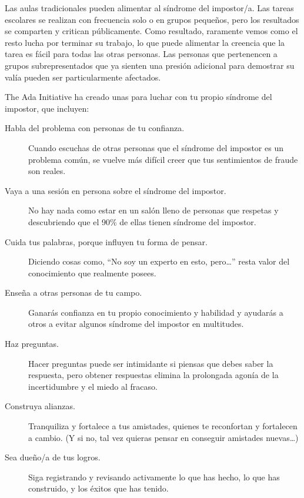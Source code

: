 Las aulas tradicionales pueden alimentar al síndrome del impostor/a.
Las tareas escolares se realizan con frecuencia solo o en grupos pequeños,
pero los resultados se comparten y critican públicamente.
Como resultado,
raramente vemos como el resto lucha por terminar su trabajo,
lo que puede alimentar la creencia que la tarea es fácil para todas las otras personas.
Las personas que pertenencen a grupos subrepresentados que ya sienten una presión adicional para demostrar su valía
pueden ser particularmente afectados.

The Ada Initiative ha creado unas 
para luchar con tu propio síndrome del impostor,
que incluyen:

\begin{description}

\item[Habla del problema con personas de tu confianza.]
  Cuando escuchas de otras personas que el síndrome del impostor es un problema común,
  se vuelve más difícil creer que tus sentimientos de fraude son reales.

\item[Vaya a una sesión en persona sobre el síndrome del impostor.]
  No hay nada como estar en un salón lleno de personas que respetas
  y descubriendo que el 90\% de ellas tienen síndrome del impostor.

\item[Cuida tus palabras, porque influyen tu forma de pensar.]
  Diciendo cosas como,
  ``No soy un experto en esto, pero{\dots}''
  resta valor del conocimiento que realmente posees.

\item[Enseña a otras personas de tu campo.]
  Ganarás confianza en tu propio conocimiento y habilidad
  y ayudarás a otros a evitar algunos síndrome del impostor en multitudes.

\item[Haz preguntas.]
    Hacer preguntas puede ser intimidante si piensas que debes saber la respuesta,
    pero obtener respuestas elimina la prolongada agonía de la incertidumbre y el miedo al fracaso.

\item[Construya alianzas.]
  Tranquiliza y fortalece a tus amistades,
  quienes te reconfortan y fortalecen a cambio.
  (Y si no, tal vez quieras pensar en conseguir amistades nuevas{\ldots})

\item[Sea dueño/a de tus logros.]
  Siga registrando y revisando activamente lo que has hecho,
  lo que has construido,
  y los éxitos que has tenido.

\end{description}


